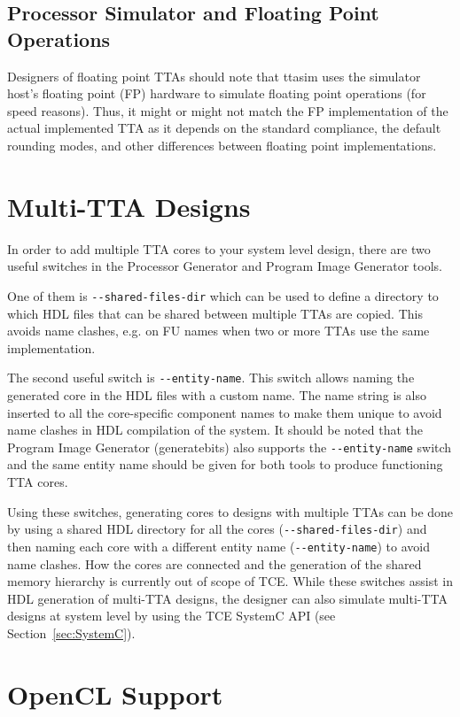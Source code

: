 \documentclass[twoside]{tceusermanual}
\begin{document}
\subsection{Processor Simulator and Floating Point Operations}

Designers of floating point TTAs should note that ttasim uses the simulator 
host's floating point (FP) hardware to simulate floating point operations (for 
speed reasons). Thus, it might or might not match the FP implementation of 
the actual implemented TTA as it depends on the standard compliance, the
default rounding modes, and other differences between floating point 
implementations.

\section{Multi-TTA Designs}

In order to add multiple TTA cores to your system level design, there are
two useful switches in the Processor Generator and Program Image Generator 
tools. 

One of them is \verb|--shared-files-dir| which can be used to define 
a directory to which HDL files that can be shared between multiple TTAs are 
copied. This avoids name clashes, e.g. on FU names when two or more TTAs 
use the same implementation. 

The second useful switch is \verb|--entity-name|. This switch allows
naming the generated core in the HDL files with a custom name. The name 
string is also inserted to all the core-specific component names to make
them unique to avoid name clashes in HDL compilation of the system. It
should be noted that the Program Image Generator (generatebits) also
supports the \verb|--entity-name| switch and the same entity name should
be given for both tools to produce functioning TTA cores.

Using these switches, generating cores to designs with multiple TTAs can
be done by using a shared HDL directory for all the cores (\verb|--shared-files-dir|) 
and then naming each core with a different entity name (\verb|--entity-name|) to 
avoid name clashes. How the cores are connected and the generation of
the shared memory hierarchy is currently out of scope of TCE. While
these switches assist in HDL generation of multi-TTA designs, the
designer can also simulate multi-TTA designs at system level by
using the TCE SystemC API (see Section~\ref{sec:SystemC}).

\section{OpenCL Support}
\end{document}

